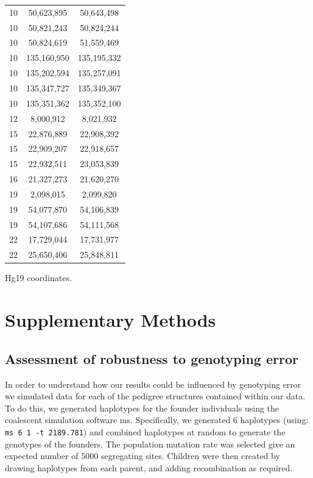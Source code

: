 \begin{table}[!h]
\begin{tabular}{|ccc|}
10 & 50,623,895 & 50,643,498 \\
10 & 50,821,243 & 50,824,244 \\
10 & 50,824,619 & 51,559,469 \\
10 & 135,160,950 & 135,195,332 \\
10 & 135,202,594 & 135,257,091 \\
10 & 135,347,727 & 135,349,367 \\
10 & 135,351,362 & 135,352,100 \\
12 & 8,000,912 & 8,021,932 \\
15 & 22,876,889 & 22,908,392 \\
15 & 22,909,207 & 22,918,657 \\
15 & 22,932,511 & 23,053,839 \\
16 & 21,327,273 & 21,620,270 \\
19 & 2,098,015 & 2,099,820 \\
19 & 54,077,870 & 54,106,839 \\
19 & 54,107,686 & 54,111,568 \\
22 & 17,729,044 & 17,731,977 \\
22 & 25,650,406 & 25,848,811 \\
    \hline \end{tabular}
     {
            Hg19 coordinates.  
    \label{tab:cointTS8}}
\end{table}

\clearpage

\section{Supplementary Methods}

\subsection{Assessment of robustness to genotyping error}

In order to understand how our results could be influenced by genotyping  
error we simulated data for each of the pedigree structures contained within our  
data.  To do this, we generated haplotypes for the founder individuals using the  
coalescent simulation software ms\cite{Hudson2002}.  Specifically, we generated 6 haplotypes (using:  
\verb|ms 6 1 -t 2189.781|) and combined haplotypes at random to generate the genotypes  
of the founders.  The population mutation rate was selected give an expected  
number of 5000 segregating sites. Children were then created by drawing  
haplotypes from each parent, and adding recombination as required.   


